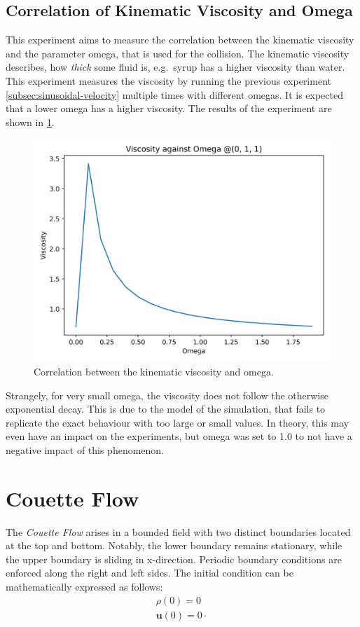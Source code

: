 \subsection{Correlation of Kinematic Viscosity and Omega}
This experiment aims to measure the correlation between the kinematic viscosity and the parameter omega, that is used for the collision.
The kinematic viscosity describes, how \textit{thick} some fluid is, e.g.\ syrup has a higher viscosity than water. %
This experiment measures the viscosity by running the previous experiment \cref{subsec:sinusoidal-velocity} multiple times with different omegas.
It is expected that a lower omega has a higher viscosity. %
The results of the experiment are shown in \cref{fig:swd-vo-viscosity-vs-omega}.

\begin{figure}[H]
    \begin{center}
        \includegraphics[width=0.5\linewidth]{graphs/ShearWaveDecay/Viscosity/viscosity_against_omega}
        \caption{Correlation between the kinematic viscosity and omega.}
        \label{fig:swd-vo-viscosity-vs-omega}
    \end{center}
\end{figure}

Strangely, for very small omega, the viscosity does not follow the otherwise exponential decay.
This is due to the model of the simulation, that fails to replicate the exact behaviour with too large or small values. %
In theory, this may even have an impact on the experiments, but omega was set to 1.0 to not have a negative impact of this phenomenon.


\section{Couette Flow}\label{sec:couette-flow}
The \textit{Couette Flow} arises in a bounded field with two distinct boundaries located at the top and bottom.
Notably, the lower boundary remains stationary, while the upper boundary is sliding in x-direction.
Periodic boundary conditions are enforced along the right and left sides.
The initial condition can be mathematically expressed as follows:
\begin{equation*}
    \begin{aligned}
        \rho(0) = 0 \\
        \mathbf{u}(0) = 0 \cdot
    \end{aligned}
\end{equation*}

